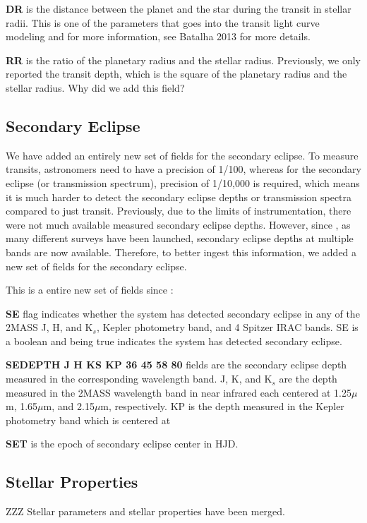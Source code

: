 \documentclass[11pt,preprint]{aastex}
\def\micron{$\mu$m}
\def\micron{$\mu$m}
\begin{document}
\begin{CJK*}{UTF8}{gbsn}
{\bf DR} is the distance between the planet and the star during the transit in stellar radii. This is one of the parameters that goes into the transit light curve modeling and for more information, see Batalha 2013 for more details. 

{\bf RR} is the ratio of the planetary radius and the stellar radius. Previously, we only reported the transit depth, which is the square of the planetary radius and the stellar radius.
Why did we add this field? 

\subsection{Secondary Eclipse}
We have added an entirely new set of fields for the secondary eclipse. To measure transits, astronomers need to have a precision of 1/100, whereas for the secondary eclipse (or transmission spectrum), precision of 1/10,000 is required, which means it is much harder to detect the secondary eclipse depths or transmission spectra compared to just transit. Previously, due to the limits of instrumentation, there were not much available measured secondary eclipse depths. However, since \cite{Wright2011}, as many different surveys have been launched, secondary eclipse depths at multiple bands are now available. Therefore, to better ingest this information, we added a new set of fields for the secondary eclipse. 

This is a entire new set of fields since \cite{Wright2011}:

{\bf SE} flag indicates whether the system has detected secondary eclipse in any of the 2MASS J, H, and K$_s$, Kepler photometry band, and 4 Spitzer IRAC bands. SE is a boolean and being true indicates the system has detected secondary eclipse. 

{\bf SEDEPTH J H KS KP 36 45 58 80} fields are the secondary eclipse depth measured in the corresponding wavelength band. J, K, and K$_s$ are the depth measured in the 2MASS wavelength band in near infrared each centered at 1.25\micron, 1.65\micron, and 2.15\micron, respectively. KP is the depth measured in the Kepler photometry band which is centered at 

{\bf SET} is the epoch of secondary eclipse center in HJD. 


\subsection{Stellar Properties}
ZZZ Stellar parameters and stellar properties have been merged. 


\end{CJK*}
\end{document}
